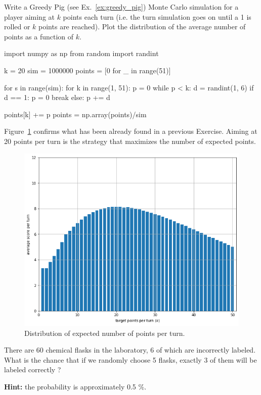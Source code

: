 \begin{question}
Write a Greedy Pig (see Ex.~\ref{ex:greedy_pig}) Monte Carlo simulation for a player aiming at $k$ points each turn (i.e. the turn simulation goes on until a 1 is rolled or $k$ points are reached).
Plot the distribution of the average number of points as a function of $k$.
\end{question}
\cprotEnv\begin{solution}
\begin{ipython}
import numpy as np
from random import randint

k = 20
sim = 1000000
points = [0 for _ in range(51)]

for s in range(sim):
    for k in range(1, 51):
        p = 0 
        while p < k:
            d = randint(1, 6)
            if d == 1:
                p = 0
                break
            else:
                p += d

points[k] += p
points = np.array(points)/sim
\end{ipython}

Figure~\ref{fig:greedy_pig_sim} confirms what has been already found in a previous Exercise. Aiming at 20 points per turn is the strategy that maximizes the number of expected points.

\begin{figure}[htbp]
	\begin{center}
		\includegraphics[width=0.7\linewidth]{figures/greedy_pig_sim}
	\end{center}
\caption{Distribution of expected number of points per turn.}
\label{fig:greedy_pig_sim}
\end{figure}
\end{solution}

\begin{question}
There are 60 chemical flasks in the laboratory, 6 of which are incorrectly labeled. What is the chance that if we randomly choose 5 flasks, exactly 3 of them will be labeled correctly ?

\noindent\textbf{Hint:} the probability is approximately 0.5 \%.
\end{question}

